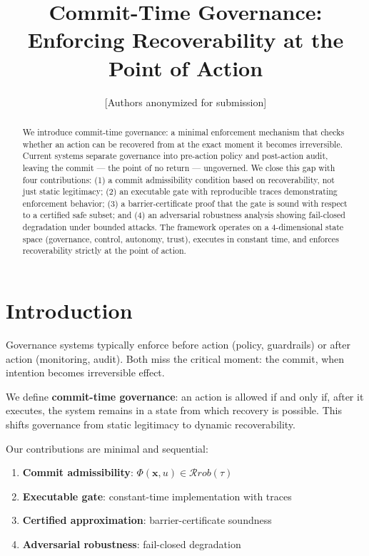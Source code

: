 \documentclass{article}
\title{\bf Commit-Time Governance: Enforcing Recoverability at the Point of Action}
\author{[Authors anonymized for submission]}
\begin{document}
\maketitle

\begin{abstract}
We introduce commit-time governance: a minimal enforcement mechanism that checks whether an action can be recovered from at the exact moment it becomes irreversible. Current systems separate governance into pre-action policy and post-action audit, leaving the commit — the point of no return — ungoverned. We close this gap with four contributions: (1) a commit admissibility condition based on recoverability, not just static legitimacy; (2) an executable gate with reproducible traces demonstrating enforcement behavior; (3) a barrier-certificate proof that the gate is sound with respect to a certified safe subset; and (4) an adversarial robustness analysis showing fail-closed degradation under bounded attacks. The framework operates on a 4-dimensional state space (governance, control, autonomy, trust), executes in constant time, and enforces recoverability strictly at the point of action.
\end{abstract}

\section{Introduction}

Governance systems typically enforce before action (policy, guardrails) or after action (monitoring, audit). Both miss the critical moment: the commit, when intention becomes irreversible effect.

We define \textbf{commit-time governance}: an action is allowed if and only if, after it executes, the system remains in a state from which recovery is possible. This shifts governance from static legitimacy to dynamic recoverability.

Our contributions are minimal and sequential:
\begin{enumerate}
    \item \textbf{Commit admissibility}: $\Phi(\mathbf{x},u)\in\mathcal{R}{rob}(\tau)$
    \item \textbf{Executable gate}: constant-time implementation with traces
    \item \textbf{Certified approximation}: barrier-certificate soundness
    \item \textbf{Adversarial robustness}: fail-closed degradation
\end{enumerate}
\end{document}

